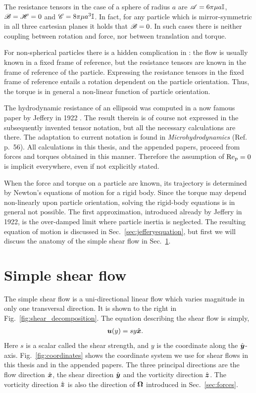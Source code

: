 \documentclass[thesis.tex]{subfiles}
\begin{document}
The resistance tensors in the case of a sphere of radius $a$ are  $\mathscr{A} = 6\pi\mu a \mathbb{I}$, $\mathscr{B}=\mathscr{H} = 0$ and $\mathscr{C} = 8\pi\mu a^3 \mathbb{I}$. In fact, for any particle which is mirror-symmetric in all three cartesian planes it holds that $\mathscr{B} = 0$. In such cases there is neither coupling between rotation and force, nor between translation and torque. 

For non-spherical particles there is a hidden complication in : the flow is usually known in a fixed frame of reference, but the resistance tensors are known in the frame of reference of the particle. Expressing the resistance tensors in the fixed frame of reference entails a rotation dependent on the particle orientation. Thus, the torque is in general a non-linear function of particle orientation.

The hydrodynamic resistance of an ellipsoid was computed in a now famous paper by Jeffery in 1922 \cite{jeffery1922}. The result therein is of course not expressed in the subsequently invented tensor notation, but all the necessary calculations are there. The adaptation to current notation is found in \emph{Microhydrodynamics} (Ref.~ p.~56). All calculations in this thesis, and the appended papers, proceed from forces and torques obtained in this manner. Therefore the assumption of $\mbox{Re}_{\mathrm p} = 0$ is implicit everywhere, even if not explicitly stated.

When the force and torque on a particle are known, its trajectory is determined by Newton's equations of motion for a rigid body. Since the torque may depend non-linearly upon particle orientation, solving the rigid-body equations is in general not possible. The first approximation, introduced already by Jeffery in 1922, is the over-damped limit where particle inertia is neglected. The resulting equation of motion is discussed in Sec.~\ref{sec:jefferyequation}, but first we will discuss the anatomy of the simple shear flow in Sec.~\ref{sec:shearflow}.

\section{Simple shear flow}\label{sec:shearflow}

The simple shear flow is a uni-directional linear flow which varies magnitude in only one transversal direction. It is shown to the right in Fig.~\ref{fig:shear_decomposition}. The equation describing the shear flow is simply,
\begin{align*}
	\mbox{\boldmath$u$}(y) &= s y \hat{\mbox{\boldmath$x$}}.
\end{align*}
Here $s$ is a scalar called the shear strength, and $y$ is the coordinate along the $\hat{\mbox{\boldmath$y$}}$-axis. 
Fig.~\ref{fig:coordinates} shows the coordinate system we use for shear flows in this thesis and in the appended papers. The three principal directions are the flow direction $\hat{\mbox{\boldmath$x$}}$, the shear direction $\hat{\mbox{\boldmath$y$}}$ and the vorticity direction $\hat{\mbox{\boldmath$z$}}$. The vorticity direction $\hat{\mbox{\boldmath$z$}}$ is also the direction of $\mbox{\boldmath$\Omega$}$ introduced in Sec.~\ref{sec:forces}.
\end{document}

